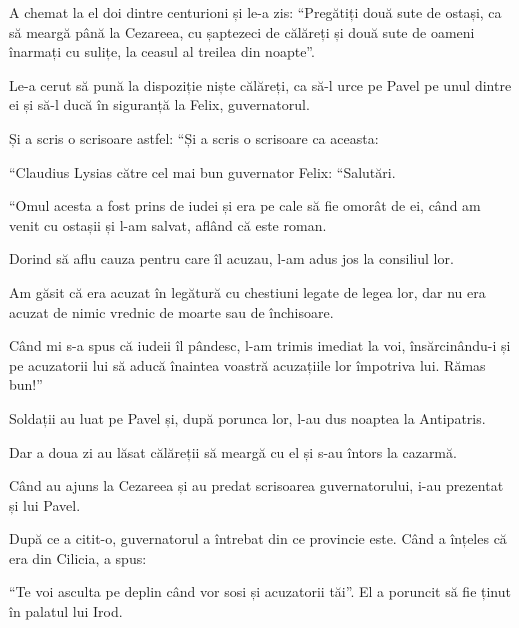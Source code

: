 {\par }{\PP {}A chemat la el doi dintre centurioni și le-a zis: “Pregătiți două sute de ostași, ca să meargă până la Cezareea, cu șaptezeci de călăreți și două sute de oameni înarmați cu sulițe, la ceasul al treilea din noapte”.

Le-a cerut să pună la dispoziție niște călăreți, ca să-l urce pe Pavel pe unul dintre ei și să-l ducă în siguranță la Felix, guvernatorul.

Și a scris o scrisoare astfel: “Și a scris o scrisoare ca aceasta:


\par }{\PP {}“Claudius Lysias către cel mai bun guvernator Felix: “Salutări.


\par }{\PP {}“Omul acesta a fost prins de iudei și era pe cale să fie omorât de ei, când am venit cu ostașii și l-am salvat, aflând că este roman.

Dorind să aflu cauza pentru care îl acuzau, l-am adus jos la consiliul lor.

Am găsit că era acuzat în legătură cu chestiuni legate de legea lor, dar nu era acuzat de nimic vrednic de moarte sau de închisoare.

Când mi s-a spus că iudeii îl pândesc, l-am trimis imediat la voi, însărcinându-i și pe acuzatorii lui să aducă înaintea voastră acuzațiile lor împotriva lui. Rămas bun!”


\par }{\PP {}Soldații au luat pe Pavel și, după porunca lor, l-au dus noaptea la Antipatris.

Dar a doua zi au lăsat călăreții să meargă cu el și s-au întors la cazarmă.

Când au ajuns la Cezareea și au predat scrisoarea guvernatorului, i-au prezentat și lui Pavel.

După ce a citit-o, guvernatorul a întrebat din ce provincie este. Când a înțeles că era din Cilicia, a spus:

“Te voi asculta pe deplin când vor sosi și acuzatorii tăi”. El a poruncit să fie ținut în palatul lui Irod.



\par }
